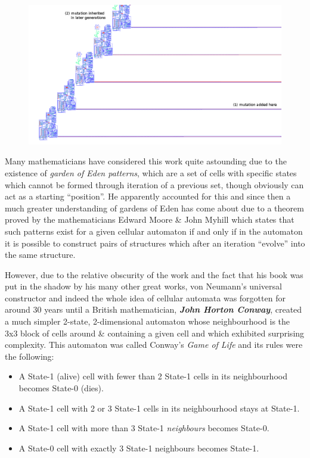 \documentclass[10pt,a4paper]{article}
\newcounter{count}
\begin{document}
\begin{multicols}{2}
\begin{figure}[htbp]
	\centering
	\includegraphics[width=\linewidth]{image_3.png}
	\caption{}
\end{figure}

Many mathematicians have considered this work quite astounding due to
the existence of \emph{garden of Eden patterns}, which are a set of
cells with specific states which cannot be formed through iteration of a
previous set, though obviously can act as a starting ``position''. He
apparently accounted for this and since then a much greater
understanding of gardens of Eden has come about due to a theorem proved
by the mathematicians Edward Moore \& John Myhill which states that such
patterns exist for a given cellular automaton if and only if in the
automaton it is possible to construct pairs of structures which after an
iteration ``evolve'' into the same structure.

However, due to the relative obscurity of the work and the fact that his
book was put in the shadow by his many other great works, von Neumann's
universal constructor and indeed the whole idea of cellular automata was
forgotten for around 30 years until a British mathematician,
\textbf{\emph{John Horton Conway}}, created a much simpler 2-state,
2-dimensional automaton whose neighbourhood is the 3x3 block of cells
around \& containing a given cell and which exhibited surprising
complexity. This automaton was called Conway's \emph{Game of Life} and
its rules were the following:

\begin{itemize}
	\item
	A State-1 (alive) cell with fewer than 2 State-1 cells in its
	neighbourhood becomes State-0 (dies).
	\item
	A State-1 cell with 2 or 3 State-1 cells in its neighbourhood stays at
	State-1.
	\item
	A State-1 cell with more than 3 State-1 \emph{neighbours} becomes
	State-0.
	\item
	A State-0 cell with exactly 3 State-1 neighbours becomes State-1.
\end{itemize}


\end{multicols}
\end{document}
